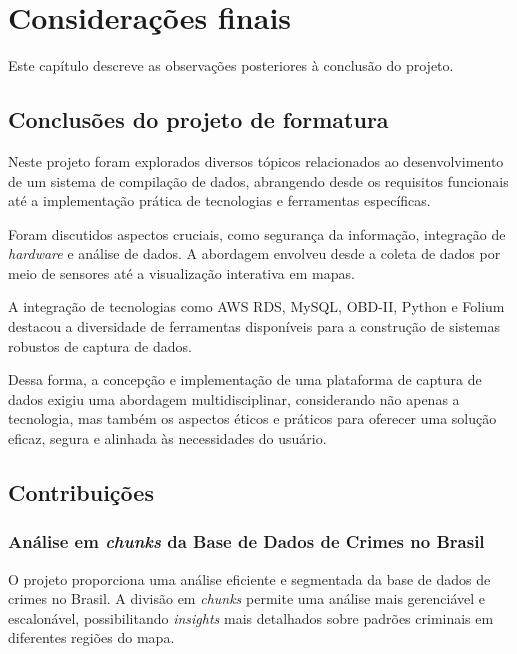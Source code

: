 \chapter{Considerações finais}

Este capítulo descreve as observações posteriores à conclusão do projeto.

\section{Conclusões do projeto de formatura}
Neste projeto foram explorados diversos tópicos relacionados ao desenvolvimento de um sistema de compilação de dados, abrangendo desde os requisitos funcionais até a implementação prática de tecnologias e ferramentas específicas. 

Foram discutidos aspectos cruciais, como segurança da informação, integração de \textit{hardware} e análise de dados. A abordagem envolveu desde a coleta de dados por meio de sensores até a visualização interativa em mapas. 

A integração de tecnologias como AWS RDS, MySQL, OBD-II, Python e Folium destacou a diversidade de ferramentas disponíveis para a construção de sistemas robustos de captura de dados. 


Dessa forma, a concepção e implementação de uma plataforma de captura de dados exigiu uma abordagem multidisciplinar, considerando não apenas a tecnologia, mas também os aspectos éticos e práticos para oferecer uma solução eficaz, segura e alinhada às necessidades do usuário.

\section{Contribuições}
\subsection{Análise em \textit{chunks} da Base de Dados de Crimes no Brasil}

O projeto proporciona uma análise eficiente e segmentada da base de dados de crimes no Brasil. A divisão em \textit{chunks} permite uma análise mais gerenciável e escalonável, possibilitando \textit{insights} mais detalhados sobre padrões criminais em diferentes regiões do mapa.

